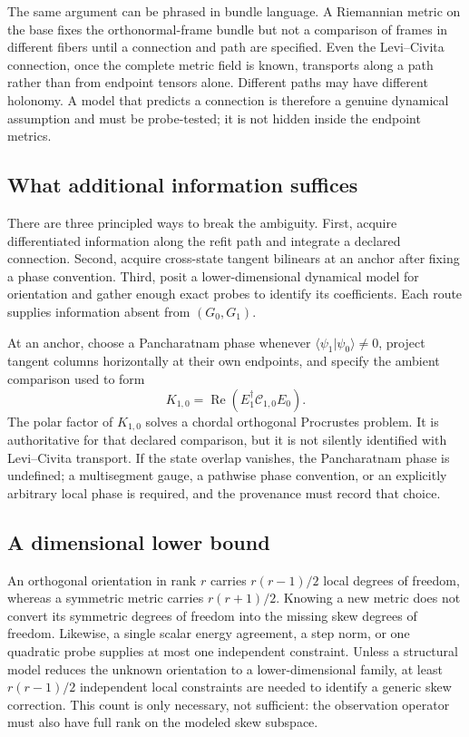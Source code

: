 \documentclass[10pt,twocolumn]{article}
\theoremstyle{definition}
\theoremstyle{remark}
\newcommand{\Rea}{\operatorname{Re}}
\begin{document}
The same argument can be phrased in bundle language.  A Riemannian metric on
the base fixes the orthonormal-frame bundle but not a comparison of frames in
different fibers until a connection and path are specified.  Even the
Levi--Civita connection, once the complete metric field is known, transports
along a path rather than from endpoint tensors alone.  Different paths may
have different holonomy.  A model that predicts a connection is therefore a
genuine dynamical assumption and must be probe-tested; it is not hidden
inside the endpoint metrics.

\subsection{What additional information suffices}

There are three principled ways to break the ambiguity.  First, acquire
differentiated information along the refit path and integrate a declared
connection.  Second, acquire cross-state tangent bilinears at an anchor after
fixing a phase convention.  Third, posit a lower-dimensional dynamical model
for orientation and gather enough exact probes to identify its coefficients.
Each route supplies information absent from $(G_0,G_1)$.

At an anchor, choose a Pancharatnam phase whenever
$\langle\psi_1|\psi_0\rangle\neq0$, project tangent columns horizontally at
their own endpoints, and specify the ambient comparison used to form
\begin{equation}
 K_{1,0}=\Rea\!\left(E_1^\dagger\mathcal C_{1,0}E_0\right).
 \label{eq:appcross}
\end{equation}
The polar factor of $K_{1,0}$ solves a chordal orthogonal Procrustes problem.
It is authoritative for that declared comparison, but it is not silently
identified with Levi--Civita transport.  If the state overlap vanishes, the
Pancharatnam phase is undefined; a multisegment gauge, a pathwise phase
convention, or an explicitly arbitrary local phase is required, and the
provenance must record that choice.

\subsection{A dimensional lower bound}

An orthogonal orientation in rank $r$ carries $r(r-1)/2$ local degrees of
freedom, whereas a symmetric metric carries $r(r+1)/2$.  Knowing a new metric
does not convert its symmetric degrees of freedom into the missing skew
degrees of freedom.  Likewise, a single scalar energy agreement, a step norm,
or one quadratic probe supplies at most one independent constraint.  Unless a
structural model reduces the unknown orientation to a lower-dimensional
family, at least $r(r-1)/2$ independent local constraints are needed to
identify a generic skew correction.  This count is only necessary, not
sufficient: the observation operator must also have full rank on the modeled
skew subspace.
\end{document}
